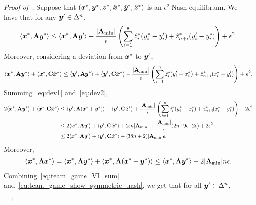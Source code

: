 \begin{proof}[Proof of~]
    Suppose that $({\bm{x}}^*, {\bm{y}}^*, {\bm{z}}^*, \hat{{\bm{x}}}^*, \hat{{\bm{y}}}^*, \hat{{\bm{z}}}^*)$ is an $\epsilon^2$-Nash equilibrium. We have that for any ${\bm{y}}' \in \Delta^n$,
    \begin{equation}
        \label{eq:dev1}
        \langle {\bm{x}}^*, \mathbf{A} {\bm{y}}^* \rangle \leq \langle {\bm{x}}^*, \mathbf{A} {\bm{y}}' \rangle + \frac{|\mathbf{A}_{\min}|}{\epsilon} \left(\sum_{i = 1}^n \hat{z}^*_i (y^*_i - y'_i) + \hat{z}^*_{n + i} (y'_i - y^*_i)\right) + \epsilon^2.
    \end{equation}
    Moreover, considering a deviation from ${\bm{x}}^*$ to ${\bm{y}}'$,
    \begin{equation}
        \label{eq:dev2}
        \langle {\bm{x}}^*, \mathbf{A} {\bm{y}}^* \rangle + \langle {\bm{x}}^*, \mathbf{C} \hat{{\bm{x}}}^* \rangle \leq \langle {\bm{y}}', \mathbf{A} {\bm{y}}^* \rangle + \langle {\bm{y}}', \mathbf{C} \hat{{\bm{x}}}^* \rangle + \frac{|\mathbf{A}_{\min}|}{\epsilon} \left(\sum_{i = 1}^n \hat{z}^*_i (y'_i - x^*_i) + \hat{z}^*_{n + i} (x^*_i - y'
        _i)\right) + \epsilon^2.
    \end{equation}
    Summing~\eqref{eq:dev1} and~\eqref{eq:dev2},
    \begin{align}
        2 \langle {\bm{x}}^*, \mathbf{A} {\bm{y}}^* \rangle + \langle {\bm{x}}^*, \mathbf{C} \hat{{\bm{x}}}^* \rangle & \leq \langle {\bm{y}}', \mathbf{A} ({\bm{x}}^* + {\bm{y}}^*) \rangle + \langle {\bm{y}}', \mathbf{C} \hat{{\bm{x}}}^* \rangle + \frac{|\mathbf{A}_{\min}|}{\epsilon} \left(\sum_{i = 1}^n \hat{z}^*_i (y^*_i - x^*_i) + \hat{z}^*_{n + i} (x^*_i - y^*
        _i)\right) + 2\epsilon^2 \notag \\
        & \leq 2 \langle {\bm{x}}^*, \mathbf{A} {\bm{y}}' \rangle + \langle {\bm{y}}', \mathbf{C} \hat{{\bm{x}}}^* \rangle + 2 \epsilon n |\mathbf{A}_{\min}| + \frac{|\mathbf{A}_{\min}|}{\epsilon} ( 2n \cdot 9 \epsilon \cdot 2\epsilon) + 2\epsilon^2 \notag \\
        & \leq 2 \langle {\bm{x}}^*, \mathbf{A} {\bm{y}}' \rangle + \langle {\bm{y}}', \mathbf{C} \hat{{\bm{x}}}^* \rangle + (38n + 2) |\mathbf{A}_{\min}| \epsilon \label{eq:team_game_VI_sum}.
    \end{align}
    Moreover, 
    \begin{align}
        \langle {\bm{x}}^*, \mathbf{A} {\bm{x}}^* \rangle =  \langle {\bm{x}}^*, \mathbf{A} {\bm{y}}^* \rangle + \langle {\bm{x}}^*, \mathbf{A} ({\bm{x}}^* - {\bm{y}}^*) \rangle \leq \langle {\bm{x}}^*, \mathbf{A} {\bm{y}}^* \rangle + 2 |\mathbf{A}_{\min}| n \epsilon \label{eq:team_game_show_symmetric_nash}.
    \end{align}
    Combining~\eqref{eq:team_game_VI_sum} and~\eqref{eq:team_game_show_symmetric_nash}, we get that for all ${\bm{y}}' \in \Delta^n$,
    \begin{align}

\end{align}
\end{proof}
